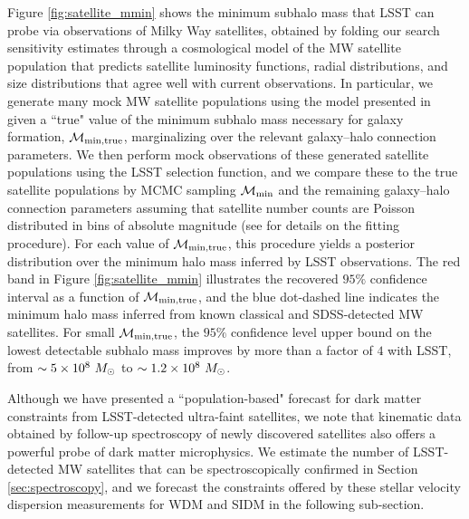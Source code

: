 \documentclass[modern,linenumbers]{aastex62}
\begin{document}
Figure \ref{fig:satellite_mmin} shows the minimum subhalo mass that LSST can probe via observations of Milky Way satellites, obtained by folding our search sensitivity estimates through a cosmological model of the MW satellite population that predicts satellite luminosity functions, radial distributions, and size distributions that agree well with current observations. In particular, we generate many mock MW satellite populations using the model presented in \cite{Nadler:2018} given a ``true" value of the minimum subhalo mass necessary for galaxy formation, $\mathcal{M}_{\rm{min,true}}$, marginalizing over the relevant galaxy--halo connection parameters. We then perform mock observations of these generated satellite populations using the LSST selection function, and we compare these to the true satellite populations by MCMC sampling $\mathcal{M}_{\rm{min}}$ and the remaining galaxy--halo connection parameters assuming that satellite number counts are Poisson distributed in bins of absolute magnitude (see \citealt{Nadler:2018} for details on the fitting procedure). For each value of $\mathcal{M}_{\rm{min,true}}$, this procedure yields a posterior distribution over the minimum halo mass inferred by LSST observations. The red band in Figure \ref{fig:satellite_mmin} illustrates the recovered $95\%$ confidence interval as a function of $\mathcal{M}_{\rm{min,true}}$, and the blue dot-dashed line indicates the minimum halo mass inferred from known classical and SDSS-detected MW satellites. %
For small $\mathcal{M}_{\rm{min,true}}$, the $95\%$ confidence level upper bound on the lowest detectable subhalo mass improves by more than a factor of $4$ with LSST, from $\sim 5 \times 10^{8}\ \Msun$ to $\sim 1.2 \times 10^{8}\ \Msun$.

Although we have presented a ``population-based" forecast for dark matter constraints from LSST-detected ultra-faint satellites, we note that kinematic data obtained by follow-up spectroscopy of newly discovered satellites also offers a powerful probe of dark matter microphysics. We estimate the number of LSST-detected MW satellites that can be spectroscopically confirmed in Section \ref{sec:spectroscopy}, and we forecast the constraints offered by these stellar velocity dispersion measurements for WDM and SIDM in the following sub-section.
\end{document}
